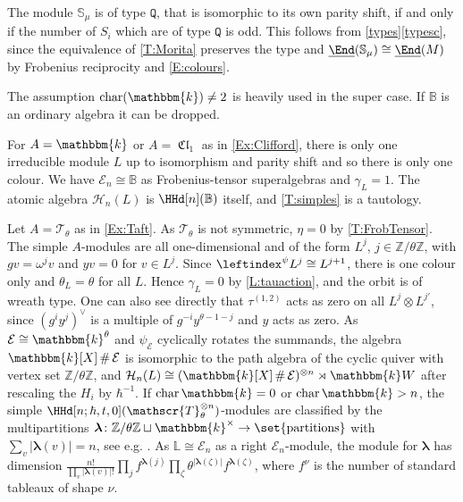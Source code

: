\documentclass[a4paper,11pt]{amsart}
\newcommand{\uEnd}{\underline{\End}}
\newcommand\blam{{\boldsymbol\lambda}}
\numberwithin{equation}{subsection}
\theoremstyle{definition}
\theoremstyle{theorem}
\theoremstyle{remark}
\DeclareMathOperator\Cl{\mathfrak{Cl}}
\newcommand\Sym{W}
\newcommand\Taft[1][\theta]{\mathscr{T}_{#1}}
\newcommand\op{\operatorname}
\newcommand\kk{\mathbbm{k}}
\newcommand\Z{\mathbb{Z}}
\newcommand{\Bo}{\mathbb{B}}
\newcommand{\Lo}{\mathbb{L}}
\newcommand{\So}{\mathbb{S}}
\DeclareMathOperator\Smash{\#}
\begin{document}
\begin{Remark}
  The module $  \So_\mu$ is of type $\mathtt Q$, that is isomorphic to its own parity shift, if and only if the number of $S_i$ which are of type $\mathtt Q$ is odd. This follows from \autoref{types}\autoref{typesc}, since the equivalence of \autoref{T:Morita} preserves the type and $\uEnd(  \So_\mu)\cong\uEnd(M)$ by Frobenius reciprocity and \autoref{E:colours}.
\end{Remark}

\begin{Remark}\label{chark}  The assumption $\op{char}(\kk)\not=2$ is heavily used in the super case. If $\Bo$  is an ordinary algebra it can be dropped.
\end{Remark}


\begin{Remark}\label{R:tautological}
  For $A=\kk$ or $A=\Cl_1$ as in \autoref{Ex:Clifford}, there is only one irreducible module $L$ up to isomorphism and parity shift and so there is only one colour. We have $\mathcal E_n\cong\Bo$ as Frobenius-tensor superalgebras and $\gamma_L=1$. The atomic algebra $\mathcal H_n(L)$ is $\HHd[n](\Bo)$ itself, and \autoref{T:simples} is a tautology.
\end{Remark}

\begin{Example}\label{Ex:TaftSimples}
  Let $A=\Taft$ as in \autoref{Ex:Taft}. As $\Taft$ is not symmetric, $\eta=0$ by \autoref{T:FrobTensor}. The simple $A$-modules are all one-dimensional and of the form $L^j$, $j\in\Z/\theta\Z$, with $gv=\omega^jv$ and $yv=0$ for $v\in L^j$. Since $\leftindex^{\psi}L^j\cong L^{j+1}$, there is one colour only and $\theta_L=\theta$ for all $L$. Hence $\gamma_L=0$ by \autoref{L:tauaction}, and the orbit is of wreath type. One can also  see directly that $\tau^{(1,2)}$ acts as zero on all $L^j\otimes L^{j'}$, since $(g^iy^j)^\vee$ is a multiple of $g^{-i}y^{\theta-1-j}$ and $y$ acts as zero.  As $\mathcal E\cong\kk^\theta$ and $\psi_{\mathcal E}$ cyclically rotates the summands, the algebra $\kk[X]\Smash\mathcal E$ is isomorphic to the path algebra of the cyclic quiver with vertex set $\Z/\theta\Z$, and $\mathcal H_n(L)\cong(\kk[X]\Smash\mathcal E)^{\otimes n}\rtimes\kk\Sym$ after rescaling the $H_i$ by $\hbar^{-1}$. If $\operatorname{char}\kk=0$ or $\operatorname{char}\kk>n$, the simple $\HHd[n;\hbar,t,0](\Taft^{\otimes n})$-modules are  classified by the multipartitions $\blam\colon\Z/\theta\Z\sqcup\kk^\times\to\set{\text{partitions}}$ with $\sum_v|\blam(v)|=n$, see e.g. \cite{CT:wreath}. As $\Lo\cong\mathcal E_n$ as a right $\mathcal E_n$-module, the module for $\blam$ has dimension
  $\frac{n!}{\prod_v|\blam(v)|!}\prod_{j}f^{\blam(j)}\prod_{\zeta}\theta^{|\blam(\zeta)|}f^{\blam(\zeta)}$, where $f^{\nu}$ is the number of standard tableaux of shape $\nu$.
\end{Example}
\end{document}
